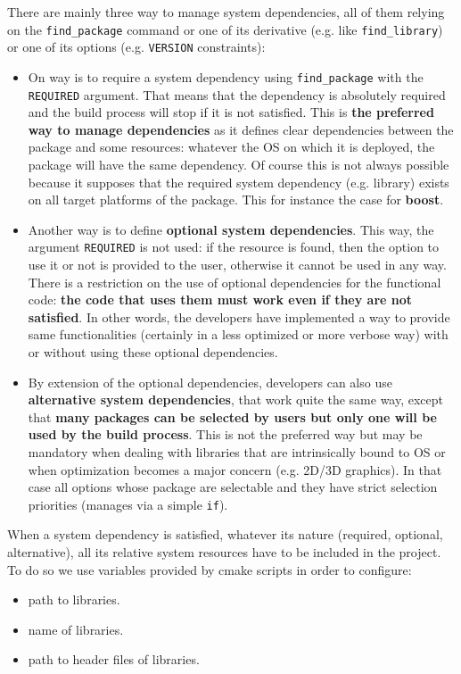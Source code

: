 \documentclass[12pt,a4paper]{article}
\begin{document}
There are mainly three way to manage system dependencies, all of them relying on the \verb|find_package| command or one of its derivative (e.g. like \verb|find_library|) or one of its options (e.g. \verb|VERSION| constraints):
\begin{itemize}
\item On way is to require a system dependency using \verb|find_package| with the \verb|REQUIRED| argument. That means that the dependency is absolutely required and the build process will stop if it is not satisfied. This is \textbf{the preferred way to manage dependencies} as it defines clear dependencies between the package and some resources: whatever the OS on which it is deployed, the package will have the same dependency. Of course this is not always possible because it supposes that the required system dependency (e.g. library) exists on all target platforms of the package. This for instance the case for \textbf{boost}.
\item Another way is to define \textbf{optional system dependencies}. This way, the argument \verb|REQUIRED| is not used: if the resource is found, then the option to use it or not is provided to the user, otherwise it cannot be used in any way.  There is a restriction on the use of optional dependencies for the functional code: \textbf{the code that uses them must work even if they are not satisfied}. In other words, the developers have implemented a way to provide same functionalities (certainly in a less optimized or more verbose way) with or without using these optional dependencies. 
\item By extension of the optional dependencies, developers can also use \textbf{alternative system dependencies}, that work quite the same way, except that \textbf{many packages can be selected by users but only one will be used by the build process}. This is not the preferred way but may be mandatory when dealing with libraries that are intrinsically bound to OS or when optimization becomes a major concern (e.g. 2D/3D graphics). In that case all options whose package are selectable and they have strict selection priorities (manages via a simple \verb|if|).
\end{itemize} 

When a system dependency is satisfied, whatever its nature (required, optional, alternative), all its relative system resources have to be included  in the project. To do so we use variables provided by cmake scripts in order to configure:
\begin{itemize}
\item path to libraries.
\item name of libraries.
\item path to header files of libraries.
\end{itemize}
\end{document}
